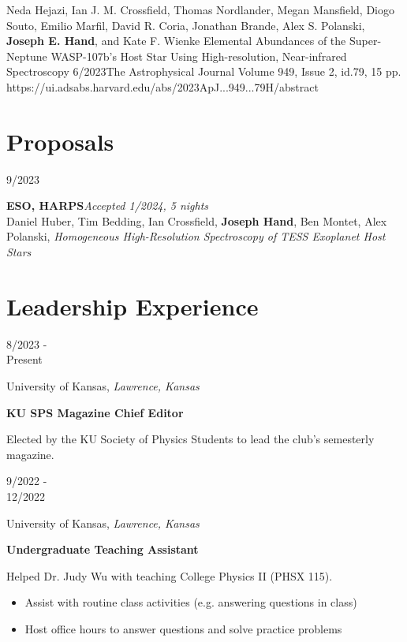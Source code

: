 \documentclass[12pt]{article}
\newenvironment{entry}[4]{
  \medskip
  \begin{minipage}[t]{0.75in}
    #3
  \end{minipage}
  \begin{minipage}[t]{\dimexpr\textwidth-0.75in}
    #1, \textit{#2}

    \textbf{#4}
    
    \smallskip
}{
  \end{minipage}
}
\begin{document}
\publication
{Neda Hejazi, Ian J. M. Crossfield, Thomas Nordlander, Megan Mansfield, Diogo Souto, Emilio Marfil, David R. Coria, Jonathan Brande, Alex S. Polanski, \textbf{Joseph E. Hand}, and Kate F. Wienke}
{Elemental Abundances of the Super-Neptune WASP-107b's Host Star Using High-resolution, Near-infrared Spectroscopy}
{6/2023}{The Astrophysical Journal}{ Volume 949, Issue 2, id.79, 15 pp.}
{https://ui.adsabs.harvard.edu/abs/2023ApJ...949...79H/abstract}

\section*{Proposals}\vspace{-1ex}

\newcommand{\proposal}[5]{
  \medskip
  \begin{minipage}[t]{0.75in}
    #3
  \end{minipage}
  \begin{minipage}[t]{\dimexpr\textwidth-0.75in}
    \textbf{#4}\hfill \textit{#5}\\
    #1, \textit{#2}
  \end{minipage}

}

\proposal{Daniel Huber, Tim Bedding, Ian Crossfield, \textbf{Joseph Hand}, Ben Montet, Alex Polanski}{Homogeneous High-Resolution Spectroscopy of TESS Exoplanet Host Stars}{9/2023}{ESO, HARPS}{Accepted 1/2024, 5 nights}

\section*{Leadership Experience}\vspace{-1ex}

\begin{entry}{University of Kansas}{Lawrence, Kansas}{8/2023 -\\ Present}{KU SPS Magazine Chief Editor}
  Elected by the KU Society of Physics Students to lead the club's
  semesterly magazine.
\end{entry}

\begin{entry}{University of Kansas}{Lawrence, Kansas}{9/2022 -\\ 12/2022}{Undergraduate Teaching Assistant}  
  Helped Dr. Judy Wu with teaching College Physics II (PHSX 115).
  \begin{itemize}
    \item Assist with routine class activities (e.g. answering questions in class)
    \item Host office hours to answer questions and solve practice problems
  \end{itemize}
\end{entry}
\end{document}

